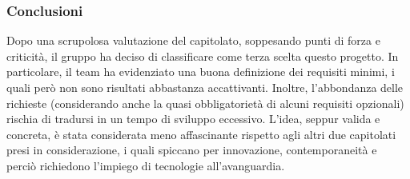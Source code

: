 \subsubsection{Conclusioni}
Dopo una scrupolosa valutazione del capitolato, soppesando punti di forza e criticità, il gruppo ha deciso di classificare come terza scelta questo progetto. In particolare, il team ha evidenziato una buona definizione dei requisiti minimi, i quali però non sono risultati abbastanza accattivanti. Inoltre, l’abbondanza delle richieste (considerando anche la quasi obbligatorietà di alcuni requisiti opzionali) rischia di tradursi in un tempo di sviluppo eccessivo. L’idea, seppur valida e concreta, è stata considerata meno affascinante rispetto agli altri due capitolati presi in considerazione, i quali spiccano per innovazione, contemporaneità e perciò richiedono l’impiego di tecnologie all’avanguardia.





